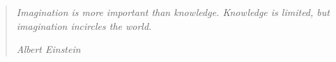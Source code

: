 \documentclass[../Main/thesis.tex]{subfiles}
\begin{document}
\chapter*{}
\null\vfill
\begin{quotation}
\em %
Imagination is more important than knowledge. Knowledge is limited, but imagination incircles the world.

\em
\medskip
\raggedleft
Albert Einstein
\end{quotation}
\vfill\vfill
\end{document}
